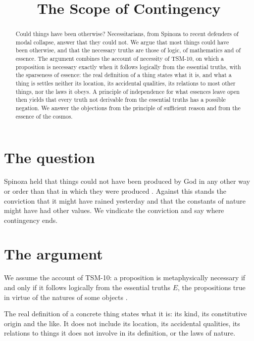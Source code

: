 \documentclass{situationist-preprint}
\title{The Scope of Contingency}
\begin{document}
\maketitle

\begin{abstract}
Could things have been otherwise? Necessitarians, from Spinoza to recent defenders of modal collapse, answer that they could not. We argue that most things could have been otherwise, and that the necessary truths are those of logic, of mathematics and of essence. The argument combines the account of necessity of TSM-10, on which a proposition is necessary exactly when it follows logically from the essential truths, with the sparseness of essence: the real definition of a thing states what it is, and what a thing is settles neither its location, its accidental qualities, its relations to most other things, nor the laws it obeys. A principle of independence for what essences leave open then yields that every truth not derivable from the essential truths has a possible negation. We answer the objections from the principle of sufficient reason and from the essence of the cosmos.
\end{abstract}

\section{The question}

Spinoza held that things could not have been produced by God in any other way or order than that in which they were produced \citep[I, prop.~33]{Spinoza1677}. Against this stands the conviction that it might have rained yesterday and that the constants of nature might have had other values. We vindicate the conviction and say where contingency ends.

\section{The argument}

We assume the account of TSM-10: a proposition is metaphysically necessary if and only if it follows logically from the essential truths $E$, the propositions true in virtue of the natures of some objects \citep{Fine1994}.

\begin{assumption}[Sparseness]\label{a:sparse}
The real definition of a concrete thing states what it is: its kind, its constitutive origin and the like. It does not include its location, its accidental qualities, its relations to things it does not involve in its definition, or the laws of nature.
\end{assumption}
\end{document}
